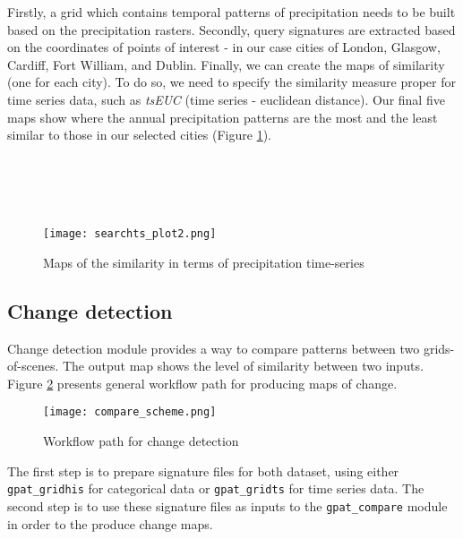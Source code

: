 Firstly, a grid which contains temporal patterns of precipitation needs to be built based on the precipitation rasters.
Secondly, query signatures are extracted based on the coordinates of points of interest - in our case cities of London, Glasgow, Cardiff, Fort William, and Dublin. Finally, we can create the maps of similarity (one for each city). 
To do so, we need to specify the similarity measure proper for time series data, such as {\it tsEUC} (time series - euclidean distance).
Our final five maps show where the annual precipitation patterns are the most and the least similar to those in our selected cities (Figure \ref{FIG:SEARCHTS2}). \\\\\\\\\\

\begin{figure}[H]
        \begin{center}
	\texttt{[image: searchts\_plot2.png]}
	\caption{Maps of the similarity in terms of precipitation time-series}
	\label{FIG:SEARCHTS2}
        \end{center}
\end{figure}

\FloatBarrier

\subsection{Change detection}

Change detection module provides a way to compare patterns between two grids-of-scenes.
The output map shows the level of similarity between two inputs.
Figure \ref{FIG:CHANGE} presents general workflow path for producing maps of change. 

\begin{figure}[H]
	\centering
	\texttt{[image: compare\_scheme.png]}
	\caption{Workflow path for change detection}
	\label{FIG:CHANGE}
\end{figure}

The first step is to prepare signature files for both dataset, using either {\tt gpat\_gridhis} for categorical data or {\tt gpat\_gridts} for time series data.
The second step is to use these signature files as inputs to the {\tt gpat\_compare} module in order to the produce change maps. \\\\

